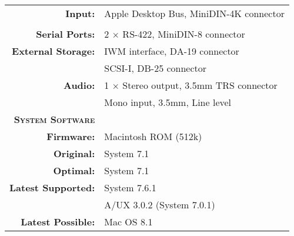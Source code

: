 \begin{tabular}{ r p{6in} }
\\
\textbf{Input:} & Apple Desktop Bus, MiniDIN-4K connector \\
\\
\textbf{Serial Ports:} & 2 \(\times\) RS-422, MiniDIN-8 connector \\
\textbf{External Storage:} & IWM interface, DA-19 connector \\
~ & SCSI-I, DB-25 connector \\
\textbf{Audio:} & 1 \(\times\) Stereo output, 3.5mm TRS connector \\
~ & Mono input, 3.5mm, Line level
\\
\textbf{\textsc{System Software}} & ~ \\
\textbf{Firmware:} & Macintosh ROM (512k) \\
\textbf{Original:} & System 7.1 \\
\textbf{Optimal:} & System 7.1 \\
\textbf{Latest Supported:} & System 7.6.1 \\
~ & A/UX 3.0.2 (System 7.0.1) \\
\textbf{Latest Possible:} & Mac OS 8.1 \\
\end{tabular}
